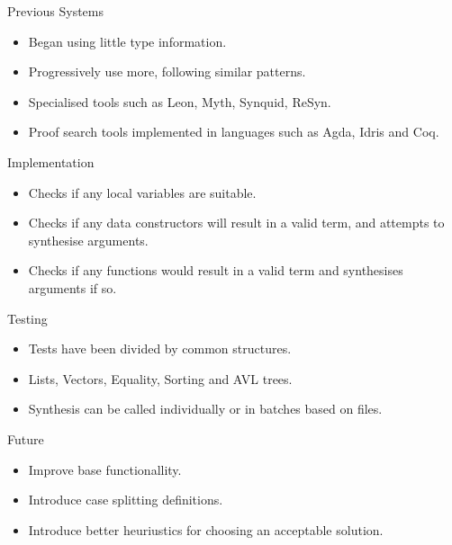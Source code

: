 \documentclass[presentation]{beamer}
\begin{document}
\begin{frame}[fragile]{Previous Systems}
  \begin{itemize}
  \item Began using little type information.
  \item Progressively use more, following similar patterns.
  \item Specialised tools such as Leon, Myth, Synquid, ReSyn.
  \item Proof search tools implemented in languages such as
    Agda, Idris and Coq.
  \end{itemize}
\end{frame}

\begin{frame}[fragile]{Implementation}
  \begin{itemize}
  \item Checks if any local variables are suitable.
  \item Checks if any data constructors will
    result in a valid term, and attempts to synthesise arguments.
  \item Checks if any functions would result in a valid term and
    synthesises arguments if so.
  \end{itemize}
\end{frame}

\begin{frame}[fragile]{Testing}
  \begin{itemize}
  \item Tests have been divided by common structures.
  \item Lists, Vectors, Equality, Sorting and AVL trees.
  \item Synthesis can be called individually or in batches based
    on files.
  \end{itemize}
\end{frame}

\begin{frame}[fragile]{Future}
  \begin{itemize}
  \item Improve base functionallity.
  \item Introduce case splitting definitions.
  \item Introduce better heuriustics for choosing an acceptable solution.
  \end{itemize}
\end{frame}
\end{document}
